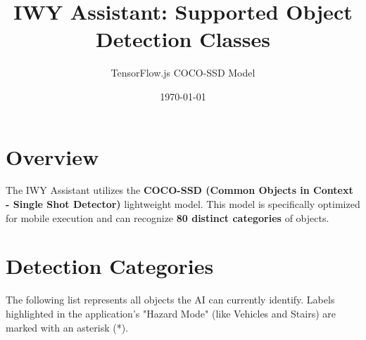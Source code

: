 \documentclass[12pt]{article}
\title{\textbf{IWY Assistant: Supported Object Detection Classes}}
\author{TensorFlow.js COCO-SSD Model}
\date{\today}
\begin{document}
\maketitle

\section*{Overview}
The IWY Assistant utilizes the \textbf{COCO-SSD (Common Objects in Context - Single Shot Detector)} lightweight model. This model is specifically optimized for mobile execution and can recognize \textbf{80 distinct categories} of objects.

\section*{Detection Categories}
The following list represents all objects the AI can currently identify. Labels highlighted in the application's "Hazard Mode" (like Vehicles and Stairs) are marked with an asterisk (*).
\end{document}
